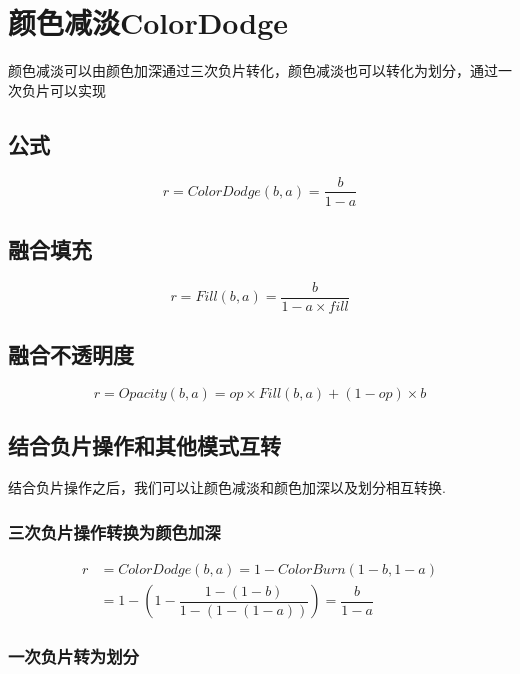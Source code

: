 \newpage
\section{ 颜色减淡ColorDodge}

颜色减淡可以由颜色加深通过三次负片转化，颜色减淡也可以转化为划分，通过一次负片可以实现

\subsection{ 公式}


\begin{equation}
	r=ColorDodge(b,a)=\dfrac{b}{1-a}
	\end{equation}

\subsection{ 融合填充}


\begin{equation}
	r= Fill(b,a) =\dfrac{b}{1-a\times fill}
	 \end{equation}

\subsection{ 融合不透明度}


\begin{equation}r=Opacity(b,a)=op\times Fill(b,a)+(1-op)\times b\end{equation}
\subsection{结合负片操作和其他模式互转}
结合负片操作之后，我们可以让颜色减淡和颜色加深以及划分相互转换.
\subsubsection{ 三次负片操作转换为颜色加深}


\begin{equation}\begin{aligned}
	r&=ColorDodge(b,a)= 1-ColorBurn(1-b,1-a)\\& =1-(1-\dfrac{1-(1-b)}{1-(1-(1-a))})=\dfrac{b}{1-a}
\end{aligned}\end{equation}

\subsubsection{ 一次负片转为划分}


